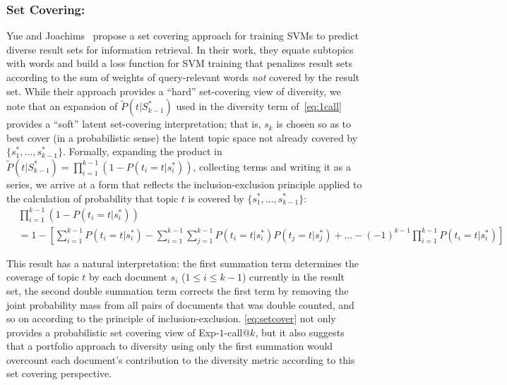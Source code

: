 \subsubsection{Set Covering:}
Yue and Joachims~\cite{yue081224Predicting} propose a set covering
approach for training SVMs to predict diverse result sets for
information retrieval.  In their work, they equate subtopics with
words and build a loss function for SVM training that penalizes
result sets according to the sum of weights of query-relevant words
\emph{not} covered by the result set.  While their approach provides a
``hard'' set-covering view of diversity, we note that an expansion of
$\tilde{P}(t | S_{k-1}^*)$ used in the diversity term
of~\eqref{eq:1call} provides a ``soft'' latent set-covering
interpretation; that is, $s_k$ is chosen so as to best cover (in a
probabilistic sense) the latent topic space not already covered by $\{
s_1^*,\ldots,s_{k-1}^* \}$.  Formally, expanding the product in
$\tilde{P}(t | S_{k-1}^*) = \prod_{i=1}^{k-1} \left(1 -
P(t_{i}=t|s_{i}^{*})\right)$, collecting terms and writing it as a
series, we arrive at a form that reflects the inclusion-exclusion
principle applied to the calculation of probability that topic $t$ is
covered by $\{ s_1^*,\ldots,s_{k-1}^* \}$:
\begin{align}
& \prod_{i=1}^{k-1} \left(1 - P(t_{i}=t|s_{i}^{*})\right) \nonumber \\
& = 1 - \left[ \sum_{i=1}^{k-1} P(t_{i}= t|s_{i}^{*}) - \sum_{i=1}^{k-1}\sum_{j=1}^{k-1}P(t_{i}= t|s_{i}^{*})P(t_{j}= t|s_{j}^{*}) + \dots - (-1)^{k-1}\prod_{i=1}^{k-1}P(t_{i}=t|s_{i}^{*})\right] \label{eq:setcover}
\end{align}

This result has a natural interpretation: the first summation term
determines the coverage of topic $t$ by each document $s_i$ ($1 \leq i
\leq k-1$) currently in the result set, the second double summation
term corrects the first term by removing the joint probability mass
from all pairs of documents that was double counted, and so on
according to the principle of inclusion-exclusion.
\eqref{eq:setcover} not only provides a probabilistic set covering
view of Exp-$1$-call@$k$, but it also suggests that a portfolio
approach to diversity using only the first summation would overcount
each document's contribution to the diversity metric according to this
set covering perspective.

